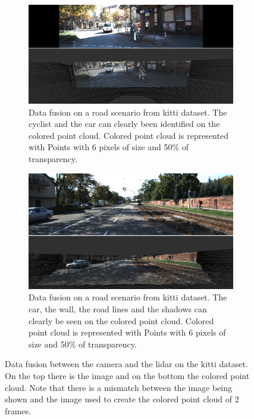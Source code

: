 \begin{figure}[H]
	\centering
	\begin{subfigure}[c]{0.45\textwidth}
		\includegraphics[width=\textwidth]{img/sensor_fusion/kitti-sensor-fusion-1.png}
		\caption{Data fusion on a road scenario from \ac{kitti} dataset. The cyclist and the car can clearly been identified on the colored point cloud. Colored point cloud is represented with Points with 6 pixels of size and 50\% of transparency.}
		\label{fig:kitti-sensor-fusion-1}
	\end{subfigure}
	\qquad
	\begin{subfigure}[c]{0.45\textwidth}
		\includegraphics[width=\textwidth]{img/sensor_fusion/kitti-sensor-fusion-2.png}
		\caption{Data fusion on a road scenario from \ac{kitti} dataset. The car, the wall, the road lines and the shadows can clearly be seen on the colored point cloud. Colored point cloud is represented with Points with 6 pixels of size and 50\% of transparency.}
		\label{fig:kitti-sensor-fusion-2}
	\end{subfigure}
	\caption{Data fusion between the camera and the \ac{lidar} on the \ac{kitti} dataset. On the top there is the image and on the bottom the colored point cloud. Note that there is a mismatch between the image being shown and the image used to create the colored point cloud of 2 frames.}
	\label{fig:kitti-sensor-fusion}
\end{figure}


